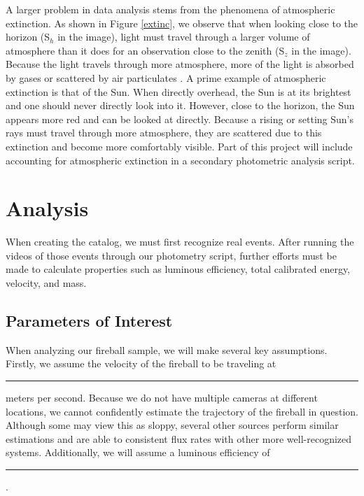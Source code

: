 A larger problem in data analysis stems from the phenomena of atmospheric extinction.
As shown in Figure \ref{extinc}, we observe that when looking close to the horizon (S$_h$ in the image), light must travel through a larger volume of atmosphere than it does for an observation close to the zenith (S$_z$ in the image).  
Because the light travels through more atmosphere, more of the light is absorbed by gases or scattered by air particulates \cite{noauthor_atmospheric_nodate}.
A prime example of atmospheric extinction is that of the Sun. 
When directly overhead, the Sun is at its brightest and one should never directly look into it.
However, close to the horizon, the Sun appears more red and can be looked at directly.
Because a rising or setting Sun's rays must travel through more atmosphere, they are scattered due to this extinction and become more comfortably visible.
Part of this project will include accounting for atmospheric extinction in a secondary photometric analysis script.

\section{Analysis}

When creating the catalog, we must first recognize real events.  
After running the videos of those events through our photometry script, further efforts must be made to calculate properties such as luminous efficiency, total calibrated energy, velocity, and mass.




\subsection{Parameters of Interest}

When analyzing our fireball sample, we will make several key assumptions.  
Firstly, we assume the velocity of the fireball to be traveling at \rule{1cm}{.1pt} meters per second.
Because we do not have multiple cameras at different locations, we cannot confidently estimate the trajectory of the fireball in question.
Although some may view this as sloppy, several other sources perform similar estimations and are able to consistent flux rates with other more well-recognized systems.
Additionally, we will assume a luminous efficiency of \rule{1cm}{.1pt}.

